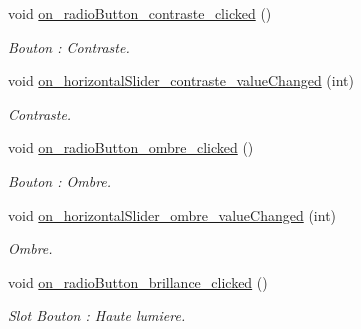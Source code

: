 \begin{DoxyCompactItemize}
\mbox{\label{classMainWindow_ad38ae230bebcd4dc68b5a2fe5c18cf4b}} 
void \hyperlink{classMainWindow_ad38ae230bebcd4dc68b5a2fe5c18cf4b}{on\+\_\+radio\+Button\+\_\+contraste\+\_\+clicked} ()
\begin{DoxyCompactList}\small\item\em Bouton \+: Contraste. \end{DoxyCompactList}\item 
\mbox{\label{classMainWindow_adb1efa488197404fc8e27cd0864348bd}} 
void \hyperlink{classMainWindow_adb1efa488197404fc8e27cd0864348bd}{on\+\_\+horizontal\+Slider\+\_\+contraste\+\_\+value\+Changed} (int)
\begin{DoxyCompactList}\small\item\em Contraste. \end{DoxyCompactList}\item 
\mbox{\label{classMainWindow_ab70e3fe99b0d5341caf390b77a7f139b}} 
void \hyperlink{classMainWindow_ab70e3fe99b0d5341caf390b77a7f139b}{on\+\_\+radio\+Button\+\_\+ombre\+\_\+clicked} ()
\begin{DoxyCompactList}\small\item\em Bouton \+: Ombre. \end{DoxyCompactList}\item 
\mbox{\label{classMainWindow_ac0eee404a887a264d0c7b7f5e2fd5c16}} 
void \hyperlink{classMainWindow_ac0eee404a887a264d0c7b7f5e2fd5c16}{on\+\_\+horizontal\+Slider\+\_\+ombre\+\_\+value\+Changed} (int)
\begin{DoxyCompactList}\small\item\em Ombre. \end{DoxyCompactList}\item 
\mbox{\label{classMainWindow_ad4ac905771cedf7d802d6ce7b0fa242e}} 
void \hyperlink{classMainWindow_ad4ac905771cedf7d802d6ce7b0fa242e}{on\+\_\+radio\+Button\+\_\+brillance\+\_\+clicked} ()
\begin{DoxyCompactList}\small\item\em Slot Bouton \+: Haute lumiere. \end{DoxyCompactList}\item 
\mbox{\label{classMainWindow_a2f09785d376668bf1df5508753e3a66d}} 

\end{DoxyCompactItemize}
